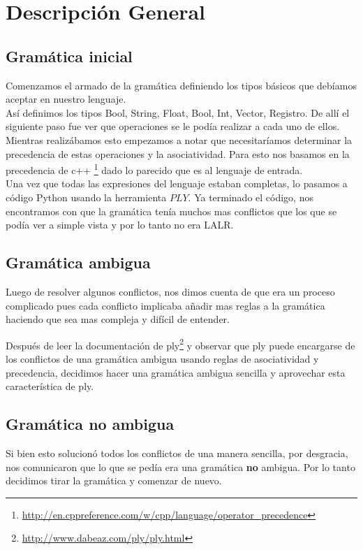 \section{Descripción General}
\subsection{Gramática inicial}
Comenzamos el armado de la gramática definiendo los tipos básicos que debíamos aceptar en nuestro lenguaje.
\\
Así definimos los tipos Bool, String, Float, Bool, Int, Vector, Registro. De allí el siguiente paso fue ver que operaciones se le podía realizar a cada uno de ellos.
\\
Mientras realizábamos esto empezamos a notar que necesitaríamos determinar la precedencia de estas operaciones y la asociatividad. Para esto nos basamos en la precedencia de c++ \footnote{\url{http://en.cppreference.com/w/cpp/language/operator_precedence}} dado lo parecido que es al lenguaje de entrada.
\\

Una vez que todas las expresiones del lenguaje estaban completas, lo pasamos a código Python usando la herramienta $PLY$. Ya terminado el código, nos encontramos con que la gramática tenía muchos mas conflictos que los que se podía ver a simple vista y por lo tanto no era LALR. 

\subsection{Gramática ambigua}

Luego de resolver algunos conflictos, nos dimos cuenta de que era un proceso complicado pues cada conflicto implicaba añadir mas reglas a la gramática haciendo que sea mas compleja y difícil de entender.

Después de leer la documentación de ply\footnote{ \url{http://www.dabeaz.com/ply/ply.html}} y observar que ply puede encargarse de los conflictos de una gramática ambigua usando reglas de asociatividad y precedencia, decidimos hacer una gramática ambigua sencilla y aprovechar esta característica de ply.

\subsection{Gramática no ambigua}

Si bien esto solucionó todos los conflictos de una manera sencilla, por desgracia, nos comunicaron que lo que se pedía era una gramática \textbf{no} ambigua. Por lo tanto decidimos tirar la gramática y comenzar de nuevo.

